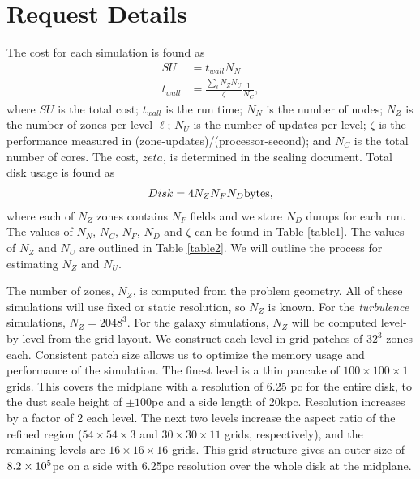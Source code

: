 \section{Request Details}


\label{sec.request}
The cost for each simulation is found as
\begin{align}
SU &= t_{wall} N_N\\
t_{wall} &= \frac{\sum_{\ell} N_Z N_U}{\zeta} \frac{1}{N_C},
\end{align}
where $SU$ is the total cost; $t_{wall}$ is the run time; $N_N$ is the number of
nodes; $N_Z$ is the number of zones per level $\ell$; $N_U$ is the number of
updates per level; $\zeta$ is
the performance measured in (zone-updates)/(processor-second); and $N_C$ is the
total number of cores.  The cost, $zeta$, is determined in the scaling document.
Total disk usage is found as
\begin{align}
	Disk = 4 N_Z N_F N_D \rm{bytes},
\end{align}
where each of $N_Z$ zones contains $N_F$ fields and we store $N_D$ dumps for
each run.  The values of $N_N$, $N_C$, $N_F$, $N_D$ and $\zeta$ can be found in
Table \ref{table1}.  The values of $N_Z$ and $N_U$ are outlined in Table
\ref{table2}.  We will outline the process for estimating $N_Z$ and $N_U$.






The number of zones, $N_Z$, is computed from the problem geometry.  All of these
simulations will use fixed or static resolution, so $N_Z$ is known.  
For the \emph{turbulence} simulations, $N_Z=2048^3$.  For the galaxy
simulations, $N_Z$ will be computed level-by-level from the grid layout.  We construct each level in grid patches of $32^3$ zones each.  
Consistent patch size allows us to optimize the memory usage and performance of the simulation.
The finest level is a thin pancake of
$100\times100\times1$ grids. This covers the midplane with a
resolution of 6.25 pc for 
the entire disk, to the dust scale height of $\pm 100$pc and a side length of
20kpc.
Resolution increases by a factor of 2 each level.  The next two levels increase
the aspect ratio of the refined region ($54\times54\times3$ and
$30\times30\times11$ grids, respectively), and the remaining levels are $16\times 16 \times 16$
grids.   This grid structure gives an outer size of $8.2\times {10^{5}}$pc on a side
with 6.25pc resolution over the whole disk at the midplane.  

